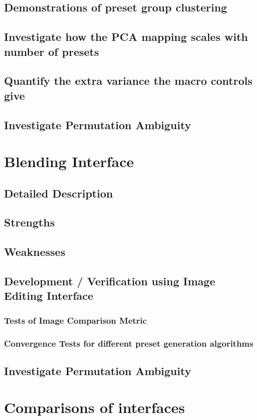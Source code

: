 \documentclass[11pt, oneside]{report}   	%
\begin{document}
\subsection{Demonstrations of preset group clustering}
\subsection{Investigate how the PCA mapping scales with number of presets}
\subsection{Quantify the extra variance the macro controls give}
\subsection{Investigate Permutation Ambiguity}

\section{Blending Interface}
\subsection{Detailed Description}
\subsection{Strengths}
\subsection{Weaknesses}
\subsection{Development / Verification using Image Editing Interface}
\subsubsection{Tests of Image Comparison Metric}
\subsubsection{Convergence Tests for different preset generation algorithms}
\subsection{Investigate Permutation Ambiguity}

\section{Comparisons of interfaces}
\end{document}
